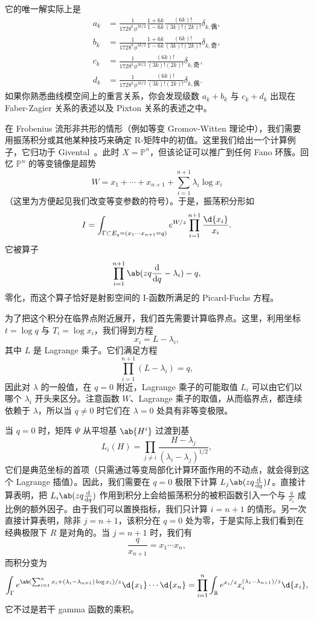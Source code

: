\documentclass{amsart}
\theoremstyle{definition}
\theoremstyle{remark}
\theoremstyle{plain}
\theoremstyle{definition}
\theoremstyle{remark}
\newcommand{\R}{\mathbb{R}}
\renewcommand{\P}{\mathbb{P}}
\newcommand{\1}{\mathbf{1}}
\newcommand{\2}{\mathbf{2}}
\newcommand{\3}{\mathbf{3}}
\begin{document}
它的唯一解实际上是
\begin{align*}
    a_k &= \frac{1}{1728^k \phi^{3k/2}} \frac{1+6k}{1-6k} \frac{(6k)!}{(3k)!(2k)!} \delta_{k, \text{偶}},  \\
    b_k &= \frac{1}{1728^k \phi^{3k/2}} \frac{1+6k}{1-6k}\frac{(6k)!}{(3k)!(2k)!} \delta_{k, \text{奇}},  \\
    c_k &= \frac{1}{1728^k \phi^{3k/2}}\frac{(6k)!}{(3k)!(2k)!} \delta_{k, \text{奇}}, \\
    d_k &= \frac{1}{1728^k \phi^{3k/2}} \frac{(6k)!}{(3k)!(2k)!} \delta_{k, \text{偶}}.
\end{align*}
如果你熟悉曲线模空间上的重言关系，你会发现级数 \(a_k + b_k\) 与 \(c_k + d_k\) 出现在 Faber-Zagier 关系的表述以及 Pixton 关系的表述之中。

在 Frobenius 流形非共形的情形（例如等变 Gromov-Witten 理论中），我们需要用振荡积分或其他某种技巧来确定 R-矩阵中的初值。这里我们给出一个计算例子，它归功于 Givental~\cite{Givental2001semisimple}。此时 \(X = \P^n\)，但该论证可以推广到任何 Fano 环簇。回忆 \(\P^n\) 的等变镜像是超势
\[ W = x_1 + \cdots + x_{n+1} + \sum_{i=1}^{n+1} \lambda_i \log x_i \]
（这里为方便起见我们改变等变参数的符号）。于是，振荡积分形如
\[ I = \int_{\Gamma \subset E_q = (x_1 \cdots x_{n+1}=q)} e^{W/z} \prod_{i=1}^{n+1} \frac{\d{x_i}}{x_i}. \]
它被算子
\[ \prod_{i=1}^{n+1}\ab(zq \odv{}{q} -\lambda_i) - q, \]
零化，而这个算子恰好是射影空间的 I-函数所满足的 Picard-Fuchs 方程。

为了把这个积分在临界点附近展开，我们首先需要计算临界点。这里，利用坐标 \(t = \log q\) 与 \(T_i = \log x_i\)，我们得到方程
\[ x_i = L - \lambda_i, \]
其中 \(L\) 是 Lagrange 乘子。它们满足方程
\[ \prod_{i=1}^{n+1} (L - \lambda_i) = q, \]
因此对 \(\lambda\) 的一般值，在 \(q = 0\) 附近，Lagrange 乘子的可能取值 \(L_i\) 可以由它们以哪个 \(\lambda_i\) 开头来区分。注意函数 \(W\)、Lagrange 乘子的取值，从而临界点，都连续依赖于 \(\lambda\)，所以当 \(q \neq 0\) 时它们在 \(\lambda = 0\) 处具有非等变极限。

当 \(q = 0\) 时，矩阵 \(\Psi\) 从平坦基 \(\ab{H^i}\) 过渡到基
\[ L_i(H) = \prod_{j \neq i} \frac{H - \lambda_j}{(\lambda_i - \lambda_j)^{1/2}}, \]
它们是典范坐标的首项（只需通过等变局部化计算环面作用的不动点，就会得到这个 Lagrange 插值）。因此，我们需要在 \(q = 0\) 极限下计算 \(L_j \ab(z q \odv{}{q}) I\)。直接计算表明，把 \(L_i \ab(z q \odv{}{q})\) 作用到积分上会给振荡积分的被积函数引入一个与 \(\frac{q}{x_i}\) 成比例的额外因子。由于我们可以置换指标，我们只计算 \(i = n+1\) 的情形。另一次直接计算表明，除非 \( j = n+1\)，该积分在 \(q = 0\) 处为零，于是实际上我们看到在经典极限下 \(R\) 是对角的。当 \(j = n+1\) 时，我们有
\[ \frac{q}{x_{n+1}} = x_1 \cdots x_n, \]
而积分变为
\[ \int_{\Gamma} e^{\ab( \sum_{i=1}^n x_i + (\lambda_i - \lambda_{n+1})\log x_i ) / z} \d{x_1} \cdots \d{x_n} = \prod_{i=1}^n \int_{\R} e^{x_i/z} x_i^{(\lambda_i - \lambda_{n+1})/z} \d{x_i}, \]
它不过是若干 gamma 函数的乘积。
\end{document}
